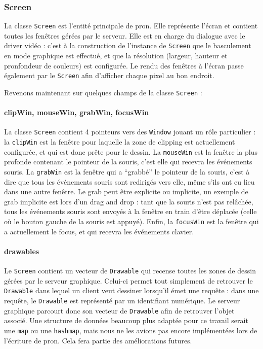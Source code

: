 \subsubsection{Screen}
\label{Screen}

La classe \verb|Screen| est l'entité principale de pron. Elle représente l'écran et contient toutes les fenêtres gérées par le serveur. Elle est en charge du dialogue avec le driver vidéo : c'est à la construction de l'instance de \verb|Screen| que le basculement en mode graphique est effectué, et que la résolution (largeur, hauteur et pronfondeur de couleurs) est configurée. Le rendu des fenêtres à l'écran passe également par le \verb|Screen| afin d'afficher chaque pixel au bon endroit.

Revenons maintenant sur quelques champs de la classe \verb|Screen| :
\paragraph{clipWin, mouseWin, grabWin, focusWin}
La classe \verb|Screen| contient 4 pointeurs vers des \verb|Window| jouant un rôle particulier : la \verb|clipWin| est la fenêtre pour laquelle la zone de clipping est actuellement configurée, et qui est donc prête pour le dessin. La \verb|mouseWin| est la fenêtre la plus profonde contenant le pointeur de la souris, c'est elle qui recevra les événements souris. La \verb|grabWin| est la fenêtre qui a ``grabbé'' le pointeur de la souris, c'est à dire que tous les événements souris sont redirigés vers elle, même s'ils ont eu lieu dans une autre fenêtre. Le grab peut être explicite ou implicite, un exemple de grab implicite est lors d'un drag and drop : tant que la souris n'est pas relâchée, tous les événements souris sont envoyés à la fenêtre en train d'être déplacée (celle où le bouton gauche de la souris est appuyé). Enfin, la \verb|focusWin| est la fenêtre qui a actuellement le focus, et qui recevra les événements clavier.

\paragraph{drawables}
Le \verb|Screen| contient un vecteur de \verb|Drawable| qui recense toutes les zones de dessin gérées par le serveur graphique. Celui-ci permet tout simplement de retrouver le \verb|Drawable| dans lequel un client veut dessiner lorsqu'il émet une requête : dans une requête, le \verb|Drawable| est représenté par un identifiant numérique. Le serveur graphique parcourt donc son vecteur de \verb|Drawable| afin de retrouver l'objet associé. Une structure de données beaucoup plus adaptée pour ce travail serait une \verb|map| ou une \verb|hashmap|, mais nous ne les avions pas encore implémentées lors de l'écriture de pron. Cela fera partie des améliorations futures.

